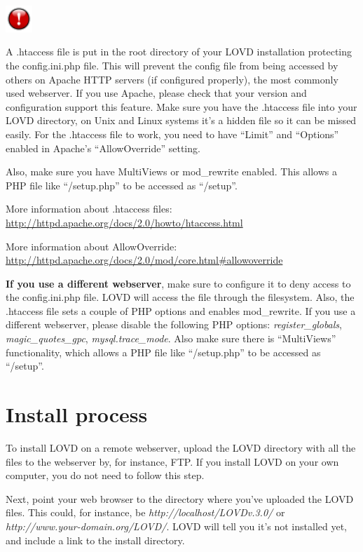 \documentclass[a4paper,oneside,openany,12pt]{memoir}
\newlength{\infoboxlength}
\newlength{\infoboxinnerlength}
\newenvironment{warntable}
  {\begin{lrbox}{\infobox}%
    \begin{minipage}[t]{1.5cm}
      \centering
      \vspace{0pt}
      \includegraphics[width=1cm,height=1cm]{lovd_warning.png}
    \end{minipage}
   \begin{minipage}[t]{\infoboxlength}\vspace{5pt}\begin{minipage}{\infoboxinnerlength}}
  {\vspace{6pt}\end{minipage}\end{minipage}\end{lrbox}%
   \begin{center}
   \fcolorbox{black}{LOVDlight}{\usebox{\infobox}}
   \end{center}}
\begin{document}
\begin{warntable}
A .htaccess file is put in the root directory of your LOVD installation protecting the config.ini.php file.
This will prevent the config file from being accessed by others on Apache HTTP servers (if configured properly), the most commonly used webserver.
If you use Apache, please check that your version and configuration support this feature.
Make sure you have the .htaccess file into your LOVD directory, on Unix and Linux systems it's a hidden file so it can be missed easily.
For the .htaccess file to work, you need to have ``Limit'' and ``Options'' enabled in Apache's ``AllowOverride'' setting.
\par
Also, make sure you have MultiViews or mod\_rewrite enabled. This allows a PHP file like ``/setup.php'' to be accessed as ``/setup''.
\\
\par
\noindent
More information about .htaccess files:\\
\url{http://httpd.apache.org/docs/2.0/howto/htaccess.html}
\\
\par
\noindent
More information about AllowOverride:\\
\url{http://httpd.apache.org/docs/2.0/mod/core.html\#allowoverride}
\\
\par
\textbf{If you use a different webserver}, make sure to configure it to deny access to the config.ini.php file.
LOVD will access the file through the filesystem.
Also, the .htaccess file sets a couple of PHP options and enables mod\_rewrite.
If you use a different webserver, please disable the following PHP options: \emph{register\_globals}, \emph{magic\_quotes\_gpc}, \emph{mysql.trace\_mode}.
Also make sure there is ``MultiViews'' functionality, which allows a PHP file like ``/setup.php'' to be accessed as ``/setup''.%
\end{warntable}





\section{Install process}
To install LOVD on a remote webserver, upload the LOVD directory with all the files to the webserver by, for instance, FTP.
If you install LOVD on your own computer, you do not need to follow this step.
\\
\par
Next, point your web browser to the directory where you've uploaded the LOVD files.
This could, for instance, be \emph{http://localhost/LOVDv.3.0/} or \emph{http://www.your-domain.org/LOVD/}.
LOVD will tell you it's not installed yet, and include a link to the install directory.
\end{document}
